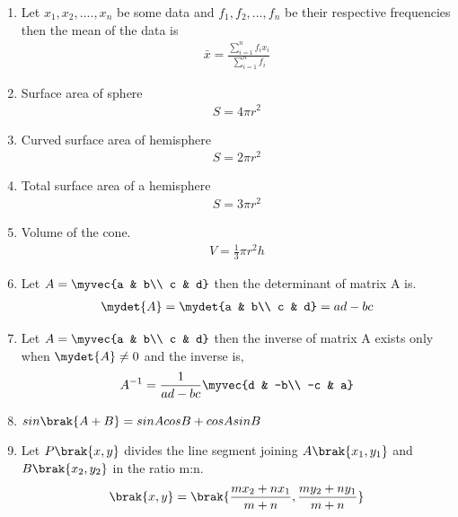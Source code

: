 \begin{enumerate}[label=\thesubsection.\arabic*, ref=\thesubsection.\theenumi]
\item
Let $x_1,x_2,....,x_n$ be some data and $f_1,f_2,...,f_n$ be their respective frequencies then the mean of the data is 
\begin{align}
\bar{x} =\frac{\sum_{i=1}^{n} f_i x_i}{\sum_{i=1}^{n} f_i}
\end{align}

\item
Surface area of sphere
\begin{align}
S = 4\pi r^2
\end{align}

\item
Curved surface area of hemisphere
\begin{align}
S = 2\pi r^2
\end{align}

\item
Total surface area of a hemisphere
\begin{align}
S = 3\pi r^2
\end{align}

\item
Volume of the cone.
\begin{align}
V = \frac{1}{3}\pi r^2 h
\end{align}

\item 
Let $A =\myvec{a & b\\ c & d}$ then the determinant of matrix A is.
\begin{align}
\mydet{A} = \mydet{a & b\\ c & d} = ad - bc
\end{align}

\item
Let $A =\myvec{a & b\\ c & d}$ then the inverse of matrix A exists only when $\mydet{A}\neq{0}$ and the inverse is,
\begin{align}
A^{-1} = \frac{1}{ad - bc}\myvec{d & -b\\ -c & a}\label{eq:EE26BTECH11211_Prob_3.10.10}
\end{align}

\item
$sin\brak{A + B} = sinAcosB + cosAsinB$

\item
Let $P\brak{x ,y}$ divides the line segment joining $A\brak{x_1,y_1}$ and $B\brak{x_2,y_2}$ in the ratio m:n.
\begin{align}
\brak{x,y} = \brak{\frac{mx_2 + nx_1}{m + n},\frac{my_2 + ny_1}{m + n}} \label{eq:EE26BTECH11211_Prob_3.12.10}
\end{align}


\end{enumerate}
